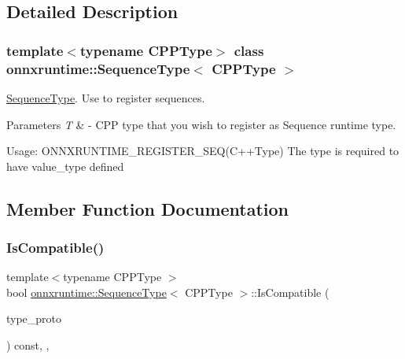 \subsection{Detailed Description}
\subsubsection*{template$<$typename C\+P\+P\+Type$>$\newline
class onnxruntime\+::\+Sequence\+Type$<$ C\+P\+P\+Type $>$}

\mbox{\hyperlink{classonnxruntime_1_1SequenceType}{Sequence\+Type}}. Use to register sequences. 


\begin{DoxyParams}{Parameters}
{\em T} & -\/ C\+PP type that you wish to register as Sequence runtime type.\\
\hline
\end{DoxyParams}
Usage\+: O\+N\+N\+X\+R\+U\+N\+T\+I\+M\+E\+\_\+\+R\+E\+G\+I\+S\+T\+E\+R\+\_\+\+S\+EQ(C++\+Type) The type is required to have value\+\_\+type defined 

\subsection{Member Function Documentation}
\mbox{\label{classonnxruntime_1_1SequenceType_afb9213564cca50fa7ad862aea0bca547}} 
\subsubsection{\texorpdfstring{Is\+Compatible()}{IsCompatible()}}
{\footnotesize\ttfamily template$<$typename C\+P\+P\+Type $>$ \\
bool \mbox{\hyperlink{classonnxruntime_1_1SequenceType}{onnxruntime\+::\+Sequence\+Type}}$<$ C\+P\+P\+Type $>$\+::Is\+Compatible (\begin{DoxyParamCaption}\item[{const O\+N\+N\+X\+\_\+\+N\+A\+M\+E\+S\+P\+A\+C\+E\+::\+Type\+Proto \&}]{type\+\_\+proto }\end{DoxyParamCaption}) const\hspace{0.3cm}{\ttfamily [inline]}, {\ttfamily [override]}, {\ttfamily [virtual]}}



